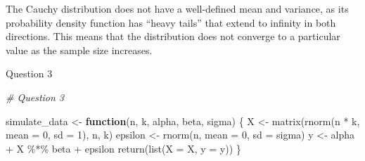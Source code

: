 \documentclass[
  a4paper,
]{article}
\newenvironment{Shaded}{\begin{snugshade}}{\end{snugshade}}
\newcommand{\AttributeTok}[1]{\textcolor[rgb]{0.77,0.63,0.00}{#1}}
\newcommand{\CommentTok}[1]{\textcolor[rgb]{0.56,0.35,0.01}{\textit{#1}}}
\newcommand{\ControlFlowTok}[1]{\textcolor[rgb]{0.13,0.29,0.53}{\textbf{#1}}}
\newcommand{\DecValTok}[1]{\textcolor[rgb]{0.00,0.00,0.81}{#1}}
\newcommand{\FunctionTok}[1]{\textcolor[rgb]{0.00,0.00,0.00}{#1}}
\newcommand{\NormalTok}[1]{#1}
\newcommand{\OtherTok}[1]{\textcolor[rgb]{0.56,0.35,0.01}{#1}}
\newcommand{\SpecialCharTok}[1]{\textcolor[rgb]{0.00,0.00,0.00}{#1}}
\begin{document}
The Cauchy distribution does not have a well-defined mean and variance,
as its probability density function has ``heavy tails'' that extend to
infinity in both directions. This means that the distribution does not
converge to a particular value as the sample size increases.

Question 3

\begin{Shaded}
\begin{Highlighting}[]
\CommentTok{\# Question 3}

\NormalTok{simulate\_data }\OtherTok{\textless{}{-}} \ControlFlowTok{function}\NormalTok{(n, k, alpha, beta, sigma) \{}
\NormalTok{  X }\OtherTok{\textless{}{-}} \FunctionTok{matrix}\NormalTok{(}\FunctionTok{rnorm}\NormalTok{(n }\SpecialCharTok{*}\NormalTok{ k, }\AttributeTok{mean =} \DecValTok{0}\NormalTok{, }\AttributeTok{sd =} \DecValTok{1}\NormalTok{), n, k)}
\NormalTok{  epsilon }\OtherTok{\textless{}{-}} \FunctionTok{rnorm}\NormalTok{(n, }\AttributeTok{mean =} \DecValTok{0}\NormalTok{, }\AttributeTok{sd =}\NormalTok{ sigma)}
\NormalTok{  y }\OtherTok{\textless{}{-}}\NormalTok{ alpha }\SpecialCharTok{+}\NormalTok{ X }\SpecialCharTok{\%*\%}\NormalTok{ beta }\SpecialCharTok{+}\NormalTok{ epsilon}
  \FunctionTok{return}\NormalTok{(}\FunctionTok{list}\NormalTok{(}\AttributeTok{X =}\NormalTok{ X, }\AttributeTok{y =}\NormalTok{ y))}
\NormalTok{\}}
\end{Highlighting}
\end{Shaded}
\end{document}
